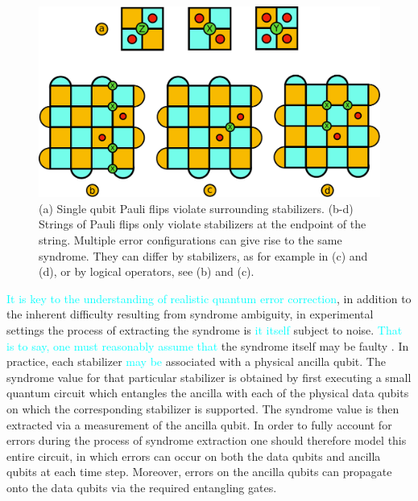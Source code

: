 \documentclass[twocolumn,preprintnumbers,amsmath,amssymb,notitlepage,nofootinbib,longbibliography,superscriptaddress,aps,pra,10pt]{revtex4-1}
\newcommand{\je}[1]{\textcolor{cyan}{#1}}
\begin{document}
	\begin{figure}
	\centering
	\includegraphics[width=1\linewidth]{figures/surface_code_examples.pdf}
	\caption{
		(a) Single qubit Pauli flips violate surrounding stabilizers.
		(b-d) Strings of Pauli flips only violate stabilizers at the endpoint of the string.
		Multiple error configurations can give rise to the same syndrome.
		They can differ by stabilizers, as for example in (c) and (d), or by logical operators, see (b) and (c).}
		\label{f:surface_code_examples}
	\end{figure}


	\je{It is key to the understanding of realistic quantum error correction},
	in addition to the inherent difficulty resulting from syndrome ambiguity, in experimental settings the process of extracting the syndrome is %
	\je{it itself} subject to noise. \je{That is to say, one must reasonably assume that}
	the syndrome itself may be faulty \cite{tomita2014low,stephens2014fault}.
	In practice, each stabilizer %
	\je{may be}
	associated with a physical ancilla qubit.
	The syndrome value for that particular stabilizer is obtained by first executing a small quantum circuit which entangles the ancilla with each of the physical data qubits on which the corresponding stabilizer is supported.
	The syndrome value is then extracted via a measurement of the ancilla qubit.
	In order to fully account for errors during the process of syndrome extraction one should therefore model this entire circuit, in which errors can occur on both the data qubits and ancilla qubits at each time step.
	Moreover, errors on the ancilla qubits can propagate onto the data qubits via the required entangling gates.
\end{document}
